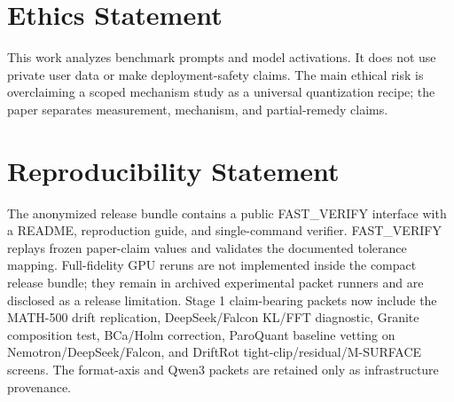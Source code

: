 \documentclass{article}
\begin{document}
\section*{Ethics Statement}
This work analyzes benchmark prompts and model activations. It does not use private user data or make deployment-safety claims. The main ethical risk is overclaiming a scoped mechanism study as a universal quantization recipe; the paper separates measurement, mechanism, and partial-remedy claims.

\section*{Reproducibility Statement}
The anonymized release bundle contains a public FAST\_VERIFY interface with a README, reproduction guide, and single-command verifier. FAST\_VERIFY replays frozen paper-claim values and validates the documented tolerance mapping. Full-fidelity GPU reruns are not implemented inside the compact release bundle; they remain in archived experimental packet runners and are disclosed as a release limitation. Stage 1 claim-bearing packets now include the MATH-500 drift replication, DeepSeek/Falcon KL/FFT diagnostic, Granite composition test, BCa/Holm correction, ParoQuant baseline vetting on Nemotron/DeepSeek/Falcon, and DriftRot tight-clip/residual/M-SURFACE screens. The format-axis and Qwen3 packets are retained only as infrastructure provenance.

\begin{table}[h]
\centering
\small
{}
\caption{Model checkpoints used by the experiments. Full provenance and file-level hashes are recorded in the archived result manifests; the release package records claim-to-script tolerance mappings.}
\end{table}
\end{document}
